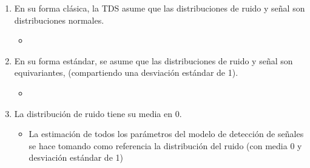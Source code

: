 \begin{enumerate}
\item En su forma clásica, la TDS asume que las distribuciones de ruido y señal son distribuciones normales.
  \begin{itemize}
  \item 
  \end{itemize}
\item En su forma estándar, se asume que las distribuciones de ruido y señal son equivariantes, (compartiendo una desviación estándar de 1).
  \begin{itemize}
  \item 
  \end{itemize}
\item La distribución de ruido tiene su media en 0. 
  \begin{itemize}
  \item La estimación de todos los parámetros del modelo de detección de señales se hace tomando como referencia la distribución del ruido (con  media 0 y desviación estándar de 1)
  \end{itemize}
\end{enumerate}



